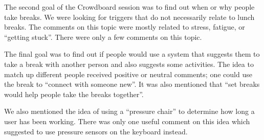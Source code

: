 The second goal of the Crowdboard session was to find out when or why people take breaks. We were looking for triggers that do not necessarily relate to lunch breaks. The comments on this topic were mostly related to stress, fatigue, or ``getting stuck''. There were only a few comments on this topic.

The final goal was to find out if people would use a system that suggests them to take a break with another person and also suggests some activities. The idea to match up different people received positive or neutral comments; one could use the break to ``connect with someone new''. It was also mentioned that ``set breaks would help people take the breaks together''.


We also mentioned the idea of using a ``pressure chair'' to determine how long a user has been working. There was only one useful comment on this idea which suggested to use pressure sensors on the keyboard instead.

